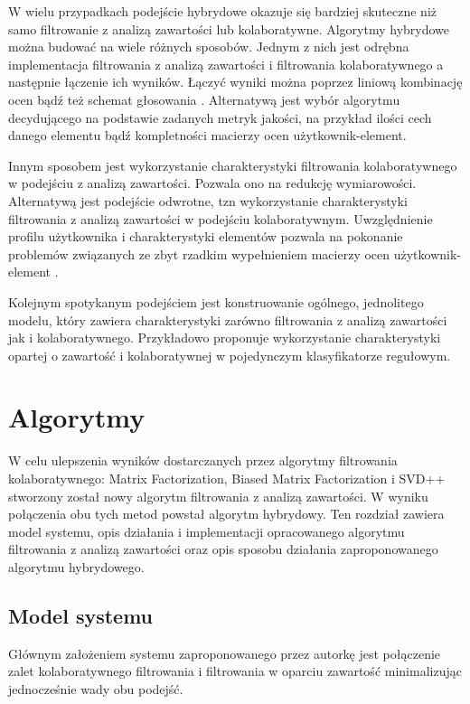 \documentclass[twoside]{iisthesis}
\begin{document}
	 W wielu przypadkach podejście hybrydowe okazuje się bardziej skuteczne niż samo filtrowanie z analizą zawartości lub kolaboratywne. Algorytmy hybrydowe można budować na wiele różnych sposobów. Jednym z nich jest odrębna implementacja filtrowania z analizą zawartości i filtrowania kolaboratywnego a następnie łączenie ich wyników. Łączyć wyniki można poprzez liniową kombinację ocen bądź też schemat głosowania \cite{claypool1999combining}. Alternatywą jest wybór algorytmu decydującego na podstawie zadanych metryk jakości, na przykład ilości cech danego elementu bądź kompletności macierzy ocen użytkownik-element.
	 
	 Innym sposobem jest wykorzystanie charakterystyki filtrowania kolaboratywnego w podejściu z analizą zawartości. Pozwala ono na redukcję wymiarowości. Alternatywą jest podejście odwrotne, tzn wykorzystanie charakterystyki filtrowania z analizą zawartości w podejściu kolaboratywnym. Uwzględnienie profilu użytkownika i charakterystyki elementów pozwala na pokonanie problemów związanych ze zbyt rzadkim wypełnieniem macierzy ocen użytkownik-element \cite{adomavicius2005toward}.
	 
	 Kolejnym spotykanym podejściem jest konstruowanie ogólnego, jednolitego modelu, który zawiera charakterystyki zarówno filtrowania z analizą zawartości jak i kolaboratywnego.
	 Przykładowo \cite{basu1998recommendation} proponuje wykorzystanie charakterystyki opartej o zawartość i kolaboratywnej w pojedynczym klasyfikatorze regułowym.
	 

 \chapter{Algorytmy}


	W celu ulepszenia wyników dostarczanych przez algorytmy filtrowania kolaboratywnego: Matrix Factorization, Biased Matrix Factorization i SVD++ stworzony został nowy algorytm filtrowania z analizą zawartości. W wyniku połączenia obu tych metod powstał algorytm hybrydowy. Ten rozdział zawiera model systemu, opis działania i implementacji opracowanego algorytmu filtrowania z analizą zawartości oraz opis sposobu działania zaproponowanego algorytmu hybrydowego.

	\section{Model systemu}
	
	Głównym założeniem systemu zaproponowanego przez autorkę jest połączenie zalet kolaboratywnego filtrowania i filtrowania w oparciu zawartość minimalizując jednocześnie wady obu podejść. 
	
\end{document}
